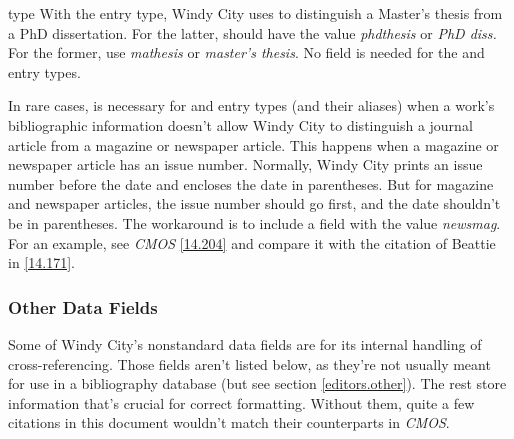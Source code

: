\documentclass[11pt,letterpaper,oneside]{article}
\begin{document}
\begin{marglist}
\item[type] With the  entry type, Windy City uses
 to distinguish a Master's thesis from a PhD
dissertation. For the latter,  should have the value
\textit{phdthesis} or \textit{PhD diss.} For the former, use
\textit{mathesis} or \textit{master's thesis}. No 
field is needed for the  and 
entry types.

In rare cases,  is necessary for  and
 entry types (and their aliases) when a work's
bibliographic information doesn't allow Windy City to distinguish a
journal article from a magazine or newspaper article. This happens
when a magazine or newspaper article has an issue number. Normally,
Windy City prints an issue number before the date and encloses the
date in parentheses. But for magazine and newspaper articles, the
issue number should go first, and the date shouldn't be in
parentheses. The workaround is to include a  field with
the value \textit{newsmag}. For an example, see \textit{CMOS}
\ref{14.204} and compare it with the citation of Beattie in
\ref{14.171}.

\end{marglist}

\subsubsection{Other Data Fields}
\label{otherfields}

Some of Windy City's nonstandard data fields are for its internal
handling of cross-referencing. Those fields aren't listed below, as
they're not usually meant for use in a bibliography database (but see
section \ref{editors.other}). The rest store information that's
crucial for correct formatting. Without them, quite a few citations in
this document wouldn't match their counterparts in \textit{CMOS}.
\end{document}
